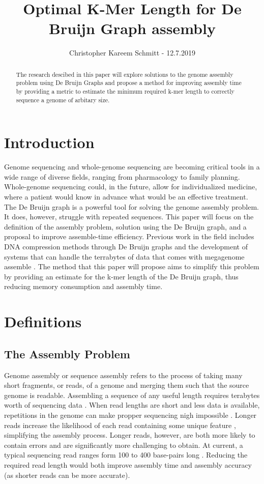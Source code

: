 \documentclass[letterpaper, 10 pt]{ieeeconf}
\title{\LARGE \bf Optimal K-Mer Length for De Bruijn Graph assembly}
\author{Christopher Kareem Schmitt - 12.7.2019}
\begin{document}
  \maketitle
  \thispagestyle{empty}
  \pagestyle{empty}

  \begin{abstract}
    The research descibed in this paper will explore solutions to the genome
    assembly problem using De Bruijn Graphs and propose a method for improving
    assembly time by providing a metric to estimate the minimum required k-mer 
    length to correctly sequence a genome of arbitary size.
  \end{abstract}


  \section{Introduction}
  Genome sequencing and whole-genome sequencing are becoming critical tools in 
  a wide range of diverse fields, ranging from pharmacology to family planning. 
  Whole-genome sequencing could, in the future, allow for individualized 
  medicine, where a patient would know in advance what would be an effective 
  treatment. The De Bruijn graph is a powerful tool for solving the genome 
  assembly problem. It does, however, struggle with repeated sequences. This 
  paper will focus on the definition of the assembly problem, solution using 
  the De Bruijn graph, and a proposal to improve assemble-time efficiency.
  Previous work in the field includes DNA compression methods through De Bruijn
  graphs \cite{dazdomnguez2019simulating} and the development of systems that
  can handle the terrabytes of data that comes with megagenome assemble
  \cite{georganas2018extreme}. The method that this paper will propose aims to
  simplify this problem by providing an estimate for the k-mer length of the
  De Bruijn graph, thus reducing memory consumption and assembly time.
  

  \section{Definitions}
  \subsection{The Assembly Problem}
  Genome assembly or sequence assembly refers to the process of taking many 
  short fragments, or reads, of a genome and merging them such that the source 
  genome is readable.  Assembling a sequence of any useful length requires 
  terabytes worth of sequencing data \cite{georganas2018extreme}.  When read
  lengths are short and less data is available, repetitions in the genome can 
  make propper sequencing nigh impossible \cite{10.1093/bioinformatics/bty648}. 
  Longer reads increase the likelihood of each read containing some unique feature 
  \cite{langmead}, simplifying the assembly process.  Longer reads, however, are
  both more likely to contain errors and are significantly more challenging to
  obtain. At current, a typical sequencing read ranges form 100 to 400 base-pairs
  long \cite{langmead}.  Reducing the required read length would both improve
  assembly time and assembly accuracy (as shorter reads can be more accurate).
\end{document}
